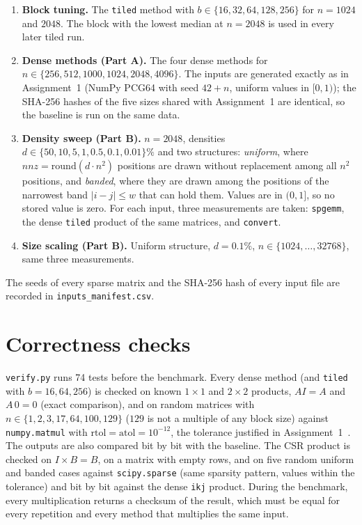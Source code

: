 \documentclass[12pt,a4paper]{report}
\begin{document}
\begin{enumerate}
  \item \textbf{Block tuning.} The \texttt{tiled} method with $b \in \{16, 32, 64, 128, 256\}$ for $n = 1024$ and
  $2048$. The block with the lowest median at $n = 2048$ is used in every later tiled run.
  \item \textbf{Dense methods (Part A).} The four dense methods for $n \in \{256, 512, 1000, 1024, 2048, 4096\}$. The
  inputs are generated exactly as in Assignment~1 (NumPy PCG64 with seed $42 + n$, uniform values in $[0, 1)$); the
  SHA-256 hashes of the five sizes shared with Assignment~1 are identical, so the baseline is run on the same data.
  \item \textbf{Density sweep (Part B).} $n = 2048$, densities $d \in \{50, 10, 5, 1, 0.5, 0.1, 0.01\}\%$ and two
  structures: \textit{uniform}, where $\mathit{nnz} = \mathrm{round}(d \cdot n^2)$ positions are drawn without
  replacement among all $n^2$ positions, and \textit{banded}, where they are drawn among the positions of the narrowest
  band $|i - j| \le w$ that can hold them. Values are in $(0, 1]$, so no stored value is zero. For each input, three
  measurements are taken: \texttt{spgemm}, the dense \texttt{tiled} product of the same matrices, and
  \texttt{convert}.
  \item \textbf{Size scaling (Part B).} Uniform structure, $d = 0.1\%$, $n \in \{1024, \dots, 32768\}$, same three
  measurements.
\end{enumerate}
The seeds of every sparse matrix and the SHA-256 hash of every input file are recorded in
\texttt{inputs\_manifest.csv}.

\section{Correctness checks}

\texttt{verify.py} runs 74 tests before the benchmark. Every dense method (and \texttt{tiled} with $b = 16, 64, 256$)
is checked on known $1\times1$ and $2\times2$ products, $AI = A$ and $A\,0 = 0$ (exact comparison), and on random
matrices with $n \in \{1, 2, 3, 17, 64, 100, 129\}$ ($129$ is not a multiple of any block size) against
\texttt{numpy.matmul} with $\mathrm{rtol} = \mathrm{atol} = 10^{-12}$, the tolerance justified in
Assignment~1~\cite{a1}. The outputs are also compared bit by bit with the baseline. The CSR product is checked on
$I \times B = B$, on a matrix with empty rows, and on five random uniform and banded cases against
\texttt{scipy.sparse} (same sparsity pattern, values within the tolerance) and bit by bit against the dense
\texttt{ikj} product. During the benchmark, every multiplication returns a checksum of the result, which must be equal
for every repetition and every method that multiplies the same input.
\end{document}
